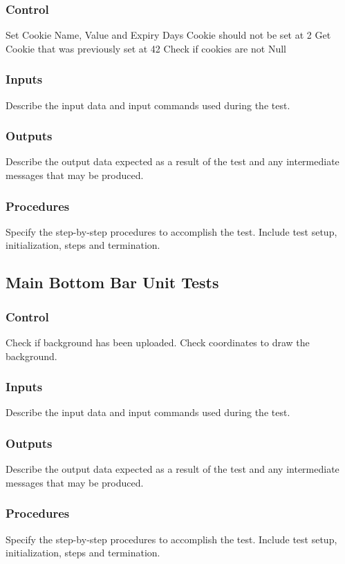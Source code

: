 \documentclass[11pt, oneside]{article}   	%
\begin{document}
\subsubsection{Control}
Set Cookie Name, Value and Expiry Days
Cookie should not be set at 2
Get Cookie that was previously set at 42
Check if cookies are not Null

\subsubsection{Inputs}
Describe the input data and input commands used during the test.

\subsubsection{Outputs}
Describe the output data expected as a result of the test and any intermediate messages that may be produced.

\subsubsection{Procedures}
Specify the step-by-step procedures to accomplish the test. Include test setup, initialization, steps and termination.



\subsection{Main Bottom Bar Unit Tests}
\subsubsection{Control}
Check if background has been uploaded.
Check coordinates to draw the background.

\subsubsection{Inputs}
Describe the input data and input commands used during the test.

\subsubsection{Outputs}
Describe the output data expected as a result of the test and any intermediate messages that may be produced.

\subsubsection{Procedures}
Specify the step-by-step procedures to accomplish the test. Include test setup, initialization, steps and termination.
\end{document}
